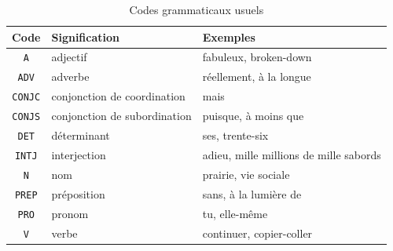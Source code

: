 \begin{table}[!ht]
\begin{center}
\begin{tabular}{|c|l|l|}
\hline
\textbf{Code} & \textbf{Signification} & \textbf{Exemples} \\
\hline
\verb+A+ & adjectif & fabuleux, broken-down \\
\hline
\verb+ADV+ & adverbe & réellement, à la longue \\
\hline
\verb+CONJC+ & conjonction de coordination & mais\\
\hline
\verb+CONJS+ & conjonction de subordination & puisque, à moins que \\
\hline
\verb+DET+ & déterminant & ses, trente-six \\
\hline
\verb+INTJ+ & interjection & adieu, mille millions de mille sabords \\
\hline
\verb+N+ & nom & prairie, vie sociale\\
\hline
\verb+PREP+ & préposition & sans, à la lumière de \\
\hline
\verb+PRO+ & pronom & tu, elle-même \\
\hline
\verb+V+ & verbe & continuer, copier-coller\\
\hline
\end{tabular}
\caption{Codes grammaticaux usuels\label{tab-grammatical-codes}}
\end{center}
\end{table}
\vspace{-0.7cm}
